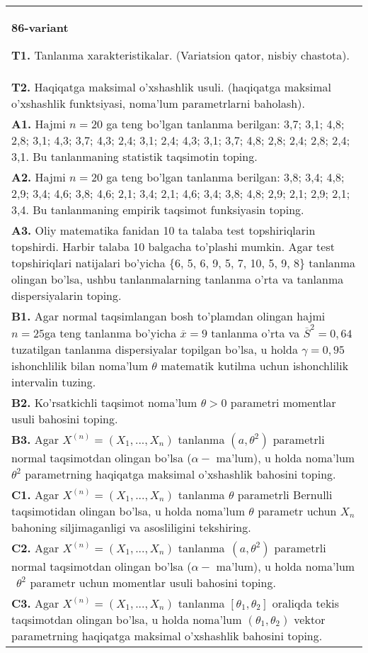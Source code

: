 \documentclass{article}
\begin{document}
\begin{tabular}{m{17cm}}
\textbf{86-variant}
\newline

\textbf{T1.} 
Tanlanma xarakteristikalar. (Variatsion qator, nisbiy chastota).
\\
\textbf{T2.} 
Haqiqatga maksimal o'xshashlik usuli. (haqiqatga maksimal o'xshashlik funktsiyasi, noma'lum parametrlarni baholash).
\\
\textbf{A1.} 
Hajmi \(n = 20\) ga teng bo'lgan tanlanma berilgan: 3,7; 3,1; 4,8; 2,8; 3,1; 4,3; 3,7; 4,3; 2,4; 3,1; 2,4; 4,3; 3,1; 3,7; 4,8; 2,8; 2,4; 2,8; 2,4; 3,1. Bu tanlanmaning statistik taqsimotin toping.
\\
\textbf{A2.} 
Hajmi \(n = 20\) ga teng bo'lgan tanlanma berilgan: 3,8; 3,4; 4,8; 2,9; 3,4; 4,6; 3,8; 4,6; 2,1; 3,4; 2,1; 4,6; 3,4; 3,8; 4,8; 2,9; 2,1; 2,9; 2,1; 3,4. Bu tanlanmaning empirik taqsimot funksiyasin toping.
\\
\textbf{A3.} 
Oliy matematika fanidan 10 ta talaba test topshiriqlarin topshirdi. Harbir talaba 10 balgacha to'plashi mumkin. Agar test topshiriqlari natijalari bo'yicha \{6, 5, 6, 9, 5, 7, 10, 5, 9, 8\} tanlanma olingan bo'lsa, ushbu tanlanmalarning tanlanma o'rta va tanlanma dispersiyalarin toping.
\\
\textbf{B1.} 
Agar normal taqsimlangan bosh to'plamdan olingan hajmi \(n = 25\)ga teng tanlanma bo'yicha \(\overline{x} = 9\) tanlanma o'rta va \({\overline{S}}^{2} = 0,64\) tuzatilgan tanlanma dispersiyalar topilgan bo'lsa, u holda \(\gamma = 0,95\) ishonchlilik bilan noma'lum \(\theta\) matematik kutilma uchun ishonchlilik intervalin tuzing.
\\
\textbf{B2.} 
Ko'rsatkichli taqsimot noma'lum \(\theta > 0\) parametri momentlar usuli bahosini toping.
\\
\textbf{B3.} 
Agar \(X^{(n)} = \left( X_{1},...,X_{n} \right)\) tanlanma \(\left( a,\theta^{2} \right)\) parametrli normal taqsimotdan olingan bo'lsa (\(\alpha -\) ma'lum), u holda noma'lum \(\theta^{2}\) parametrning haqiqatga maksimal o'xshashlik bahosini toping.
\\
\textbf{C1.} 
Agar \(X^{(n)} = \left( X_{1},...,X_{n} \right)\) tanlanma \(\theta\) parametrli Bernulli taqsimotidan olingan bo'lsa, u holda noma'lum \(\theta\) parametr uchun \(X_{n}\) bahoning siljimaganligi va asosliligini tekshiring.
\\
\textbf{C2.} 
Agar \(X^{(n)} = \left( X_{1},...,X_{n} \right)\) tanlanma\(\ \ (a,\theta^{2})\) parametrli normal taqsimotdan olingan bo'lsa (\(\alpha -\) ma'lum), u holda noma'lum\(\ \ \theta^{2}\) parametr uchun momentlar usuli bahosini toping.
\\
\textbf{C3.} 
Agar \(X^{(n)} = \left( X_{1},...,X_{n} \right)\) tanlanma \(\left\lbrack \theta_{1},\theta_{2} \right\rbrack\) oraliqda tekis taqsimotdan olingan bo'lsa, u holda noma'lum \(\left( \theta_{1},\theta_{2} \right)\) vektor parametrning haqiqatga maksimal o'xshashlik bahosini toping.
\\

\end{tabular}
\vspace{1cm}
\end{document}
